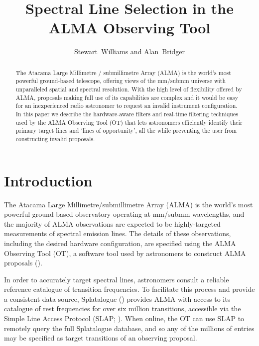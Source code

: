 
\resetcounters




\title{Spectral Line Selection in the ALMA Observing Tool}
\author{Stewart~Williams and Alan~Bridger
}


\begin{abstract}
The Atacama Large Millimetre / submillimetre Array (ALMA) is the world's most powerful ground-based telescope, offering views of the mm/submm universe with unparalleled spatial and spectral resolution. With the high level of flexibility offered by ALMA, proposals making full use of its capabilities are complex and it would be easy for an inexperienced radio astronomer to request an invalid instrument configuration. In this paper we describe the hardware-aware filters and real-time filtering techniques used by the ALMA Observing Tool (OT) that lets astronomers efficiently identify their primary target lines and `lines of opportunity', all the while preventing the user from constructing invalid proposals.
\end{abstract}

\section{Introduction}
\label{sec:introduction}
The Atacama Large Millimetre/submillimetre Array (ALMA) is the world's most powerful ground-based observatory operating at mm/submm wavelengths, and the majority of ALMA observations are expected to be highly-targeted measurements of spectral emission lines. The details of these observations, including the desired hardware configuration, are specified using the ALMA Observing Tool (OT), a software tool used by astronomers to construct ALMA proposals (\cite{bridger_2004}).

In order to accurately target spectral lines, astronomers consult a reliable reference catalogue of transition frequencies. To facilitate this process and provide a consistent data source, Splatalogue (\cite{splatalogue}) provides ALMA with access to its catalogue of rest frequencies for over six million transitions, accessible via the Simple Line Access Protocol (SLAP; \cite{SLAP}). When online, the OT can use SLAP to remotely query the full Splatalogue database, and so any of the millions of entries may be specified as target transitions of an observing proposal.

